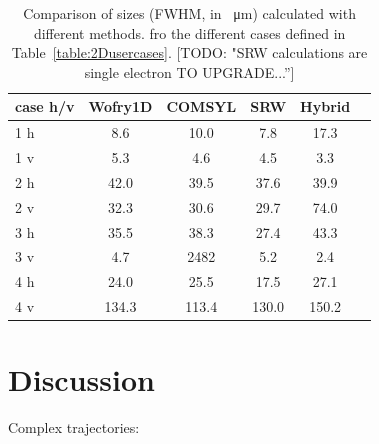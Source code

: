\documentclass{iucr}              %
\newcommand{\todo}[1]{{\color{red}[TODO: "#1'']}}
\newcommand{\inred}[1]{{\color{red}#1}}
\begin{document}
\begin{table}[]
    \label{table:comparison}
    \caption{Comparison of sizes (FWHM, in \SI{}{\micro\meter}) calculated with different methods. fro the different cases defined in Table~\ref{table:2Dusercases}.
    \todo{SRW calculations are single electron TO UPGRADE...}}
    \centering
    \begin{tabular}{p{}|c|c|c|c|c|}
         case h/v &
         Wofry1D&
         COMSYL&
         SRW&
         Hybrid \\
         \hline
1 h  & 8.6   & 10.0  & 7.8   & 17.3 \\
1 v  & 5.3   & 4.6   & 4.5   & 3.3 \\
\hline
2 h  & 42.0  & 39.5  & 37.6  & 39.9 \\
2 v  & 32.3  & 30.6  & 29.7  & 74.0 \\
\hline \hline
3 h  & 35.5  & 38.3          & 27.4  & 43.3 \\
3 v  & 4.7   & \inred{2482}  & 5.2   & 2.4 \\
\hline
4 h  & 24.0  & 25.5  & 17.5  & 27.1 \\
4 v  & 134.3 & 113.4 & 130.0 & 150.2 \\



    \end{tabular}


\end{table}
\section{Discussion}
\label{sec:discussion}

Complex trajectories: 
\end{document}
